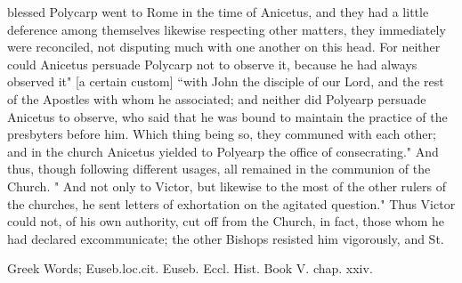 blessed Polycarp went to Rome in the time of Anicetus, and they had a little deference among themselves likewise respecting other matters, they immediately were reconciled, not disputing much with one another on this head. For neither could Anicetus persuade Polycarp not to observe it, because he had always observed it" [a certain custom] “with John the disciple of our Lord, and the rest of the Apostles with whom he associated; and neither did Polyearp persuade Anicetus to observe, who said that he was bound to maintain the practice of the presbyters before him. Which thing being so, they communed with each other; and in the church Anicetus yielded to Polyearp the office of consecrating." And thus, though following different usages, all remained in the communion of the Church. " And not only to Victor, but likewise to the most of the other rulers of the churches, he sent letters of exhortation on the agitated question." Thus Victor could not, of his own authority, cut off from the Church, in fact, those whom he had declared excommunicate; the other Bishops resisted him vigorously, and St.

Greek Words; Euseb.loc.cit. Euseb. Eccl. Hist. Book V. chap. xxiv.

